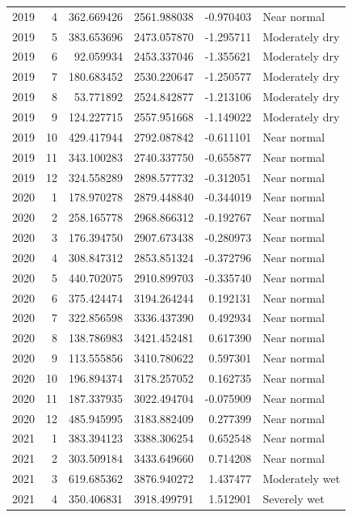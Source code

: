 \begin{tabular}{rrrrrl}
2019 & 4 & 362.669426 & 2561.988038 & -0.970403 & Near normal \\
2019 & 5 & 383.653696 & 2473.057870 & -1.295711 & Moderately dry \\
2019 & 6 & 92.059934 & 2453.337046 & -1.355621 & Moderately dry \\
2019 & 7 & 180.683452 & 2530.220647 & -1.250577 & Moderately dry \\
2019 & 8 & 53.771892 & 2524.842877 & -1.213106 & Moderately dry \\
2019 & 9 & 124.227715 & 2557.951668 & -1.149022 & Moderately dry \\
2019 & 10 & 429.417944 & 2792.087842 & -0.611101 & Near normal \\
2019 & 11 & 343.100283 & 2740.337750 & -0.655877 & Near normal \\
2019 & 12 & 324.558289 & 2898.577732 & -0.312051 & Near normal \\
2020 & 1 & 178.970278 & 2879.448840 & -0.344019 & Near normal \\
2020 & 2 & 258.165778 & 2968.866312 & -0.192767 & Near normal \\
2020 & 3 & 176.394750 & 2907.673438 & -0.280973 & Near normal \\
2020 & 4 & 308.847312 & 2853.851324 & -0.372796 & Near normal \\
2020 & 5 & 440.702075 & 2910.899703 & -0.335740 & Near normal \\
2020 & 6 & 375.424474 & 3194.264244 & 0.192131 & Near normal \\
2020 & 7 & 322.856598 & 3336.437390 & 0.492934 & Near normal \\
2020 & 8 & 138.786983 & 3421.452481 & 0.617390 & Near normal \\
2020 & 9 & 113.555856 & 3410.780622 & 0.597301 & Near normal \\
2020 & 10 & 196.894374 & 3178.257052 & 0.162735 & Near normal \\
2020 & 11 & 187.337935 & 3022.494704 & -0.075909 & Near normal \\
2020 & 12 & 485.945995 & 3183.882409 & 0.277399 & Near normal \\
2021 & 1 & 383.394123 & 3388.306254 & 0.652548 & Near normal \\
2021 & 2 & 303.509184 & 3433.649660 & 0.714208 & Near normal \\
2021 & 3 & 619.685362 & 3876.940272 & 1.437477 & Moderately wet \\
2021 & 4 & 350.406831 & 3918.499791 & 1.512901 & Severely wet \\

\end{tabular}
